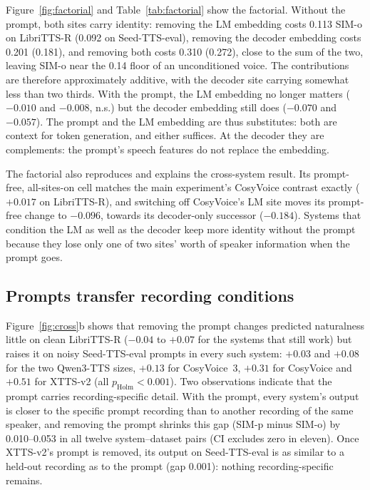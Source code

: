 \documentclass[10pt]{article}
\begin{document}
Figure~\ref{fig:factorial} and Table~\ref{tab:factorial} show the factorial.
Without the prompt, both sites carry identity: removing the LM embedding costs 0.113 SIM-o on LibriTTS-R (0.092 on Seed-TTS-eval), removing the decoder embedding costs 0.201 (0.181), and removing both costs 0.310 (0.272), close to the sum of the two, leaving SIM-o near the 0.14 floor of an unconditioned voice.
The contributions are therefore approximately additive, with the decoder site carrying somewhat less than two thirds.
With the prompt, the LM embedding no longer matters ($-0.010$ and $-0.008$, n.s.) but the decoder embedding still does ($-0.070$ and $-0.057$).
The prompt and the LM embedding are thus substitutes: both are context for token generation, and either suffices.
At the decoder they are complements: the prompt's speech features do not replace the embedding.

The factorial also reproduces and explains the cross-system result.
Its prompt-free, all-sites-on cell matches the main experiment's CosyVoice contrast exactly ($+0.017$ on LibriTTS-R), and switching off CosyVoice's LM site moves its prompt-free change to $-0.096$, towards its decoder-only successor ($-0.184$).
Systems that condition the LM as well as the decoder keep more identity without the prompt because they lose only one of two sites' worth of speaker information when the prompt goes.

\subsection{Prompts transfer recording conditions}
\label{sec:recording}

Figure~\ref{fig:cross}b shows that removing the prompt changes predicted naturalness little on clean LibriTTS-R ($-0.04$ to $+0.07$ for the systems that still work) but raises it on noisy Seed-TTS-eval prompts in every such system: $+0.03$ and $+0.08$ for the two Qwen3-TTS sizes, $+0.13$ for CosyVoice~3, $+0.31$ for CosyVoice and $+0.51$ for XTTS-v2 (all $p_\text{Holm}{<}0.001$).
Two observations indicate that the prompt carries recording-specific detail.
With the prompt, every system's output is closer to the specific prompt recording than to another recording of the same speaker, and removing the prompt shrinks this gap (SIM-p minus SIM-o) by 0.010--0.053 in all twelve system--dataset pairs (CI excludes zero in eleven).
Once XTTS-v2's prompt is removed, its output on Seed-TTS-eval is as similar to a held-out recording as to the prompt (gap 0.001): nothing recording-specific remains.
\end{document}
